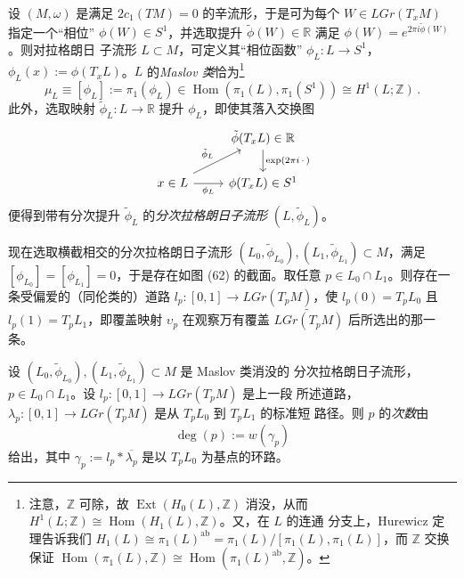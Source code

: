 \begin{Def}\label{def:5.21}
设 $(M,\omega)$ 是满足 $2c_1(TM)=0$ 的辛流形，于是可为每个
$W\in LGr(T_xM)$ 指定一个“相位” $\phi(W)\in S^1$，并选取提升
$\tilde\phi(W)\in\mathbb R$ 满足 $\phi(W)=e^{2\pi i\tilde\phi(W)}$。则对拉格朗日
子流形 $L\subset M$，可定义其“相位函数” $\phi_L:L\to S^1$，
$\phi_L(x):=\phi(T_xL)$。$L$ 的\emph{Maslov 类}恰为\footnote{注意，$\mathbb Z$
可除，故 $\operatorname{Ext}(H_0(L),\mathbb Z)$ 消没，从而
$H^1(L;\mathbb Z)\cong\operatorname{Hom}(H_1(L),\mathbb Z)$。又，在 $L$ 的连通
分支上，Hurewicz 定理告诉我们
$H_1(L)\cong\pi_1(L)^{\mathrm{ab}}=\pi_1(L)/[\pi_1(L),\pi_1(L)]$，而 $\mathbb Z$
交换保证 $\operatorname{Hom}(\pi_1(L),\mathbb Z)\cong
\operatorname{Hom}(\pi_1(L)^{\mathrm{ab}},\mathbb Z)$。}
\begin{equation}
\mu_L\equiv[\phi_L]:=\pi_1(\phi_L)\in\operatorname{Hom}(\pi_1(L),\pi_1(S^1))
\cong H^1(L;\mathbb Z)\,.
\label{eq:5.63}
\end{equation}
此外，选取映射 $\tilde\phi_L:L\to\mathbb R$ 提升 $\phi_L$，即使其落入交换图
\begin{equation}
\begin{tikzcd}
& \tilde\phi(T_xL)\in\mathbb R \arrow[d,"\exp(2\pi i\,\cdot\,)"] \\
x\in L \arrow[ur,"\tilde\phi_L"] \arrow[r,"\phi_L"'] & \phi(T_xL)\in S^1
\end{tikzcd}
\label{eq:5.64}
\end{equation}
便得到带有分次提升 $\tilde\phi_L$ 的\emph{分次拉格朗日子流形}
$(L,\tilde\phi_L)$。
\end{Def}


现在选取横截相交的分次拉格朗日子流形
$(L_0,\tilde\phi_{L_0}),(L_1,\tilde\phi_{L_1})\subset M$，满足
$[\phi_{L_0}]=[\phi_{L_1}]=0$，于是存在如图 (62) 的截面。取任意
$p\in L_0\cap L_1$。则存在一条受偏爱的（同伦类的）道路
$l_p:[0,1]\to LGr(T_pM)$，使 $l_p(0)=T_pL_0$ 且 $l_p(1)=T_pL_1$，即覆盖映射
$\upsilon_p$ 在观察万有覆盖 $\widetilde{LGr(T_pM)}$ 后所选出的那一条。

\begin{Def}\label{def:5.22}
设 $(L_0,\tilde\phi_{L_0}),(L_1,\tilde\phi_{L_1})\subset M$ 是 Maslov 类消没的
分次拉格朗日子流形，$p\in L_0\cap L_1$。设 $l_p:[0,1]\to LGr(T_pM)$ 是上一段
所述道路，$\lambda_p:[0,1]\to LGr(T_pM)$ 是从 $T_pL_0$ 到 $T_pL_1$ 的标准短
路径。则 $p$ 的\emph{次数}由
\begin{equation}
\deg(p):=w(\gamma_p)
\label{eq:5.65}
\end{equation}
给出，其中 $\gamma_p:=l_p*\overline{\lambda_p}$ 是以 $T_pL_0$ 为基点的环路。
\end{Def}

